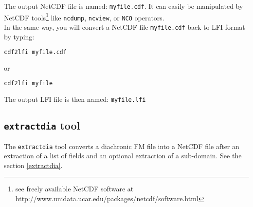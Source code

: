 \noindent The output NetCDF file is named:
\texttt{myfile.cdf}. 
It can easily be manipulated by NetCDF tools\footnote{see
freely available NetCDF software at  http://www.unidata.ucar.edu/packages/netcdf/software.html} like
\texttt{ncdump}, \texttt{ncview}, or \texttt{NCO} operators.\\

\noindent In the same way, you will convert a NetCDF
file \texttt{myfile.cdf} back to LFI format by typing:

\begin{verbatim}
cdf2lfi myfile.cdf
\end{verbatim}
or
\begin{verbatim}
cdf2lfi myfile
\end{verbatim}
The output LFI file is then named: \texttt{myfile.lfi}


\subsection{{\tt extractdia} tool}
The \texttt{extractdia} tool converts a diachronic FM file into a NetCDF file after an extraction of a list of fields and an optional extraction of a sub-domain.  See the section \ref{extractdia}.


